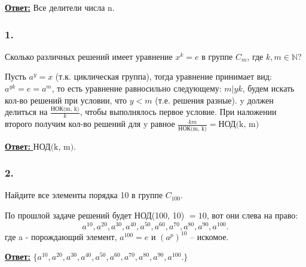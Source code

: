 \documentclass[a4paper,14pt]{article} %
\begin{document}
\underline{\textbf{Ответ:}} Все делители числа n.


\subsubsection*{1.} Сколько различных решений имеет уравнение $x^k = e$ в группе $C_m$, 
\newline где $k, m \in \mathds{N}$?

Пусть $a^y = x$ (т.к. циклическая группа), тогда уравнение принимает вид: $a^{yk} = e = a^m$, то есть уравнение равносильно следующему:
$m|yk$, будем искать кол-во решений при условии, что $y < m$ (т.е. решения разные). y должен делиться на $\frac{\text{НОК(m, k)}}{k}$, чтобы
выполнялось первое условие. При наложении второго получим кол-во решений для y равное $\frac{km}{\text{НОК(m, k)}} = \text{НОД(k, m)}$

\underline{\textbf{Ответ: }} $\text{НОД(k, m)}$.

\subsubsection*{2. } Найдите все элементы порядка 10 в группе $C_100$.

По прошлой задаче решений будет НОД(100, 10) $ = 10$, вот они слева на право:
\begin{equation*}
a^{10}, a^{20}, a^{30}, a^{40}, a^{50}, a^{60}, a^{70}, a^{80}, a^{90}, a^{100}.
\end{equation*}
где a - порождающий элемент, $a^100 = e$ и $(a^p)^{10}$ -- искомое.

\underline{\textbf{Ответ:}} $\{a^{10}, a^{20}, a^{30}, a^{40}, a^{50}, a^{60}, a^{70}, a^{80}, a^{90}, a^{100}.\}$
\end{document}

